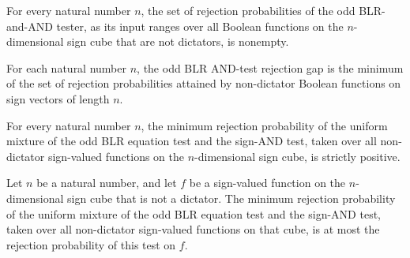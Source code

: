 \begin{theorem}
\label{FABL.oddBLRAndAndRejectionValues_nonempty}
\leanok
{}
For every natural number $n$, the set of rejection probabilities of the odd BLR-and-AND
tester, as its input ranges over all Boolean functions on the $n$-dimensional sign cube
that are not dictators, is nonempty.
\end{theorem}

\begin{definition}
\label{FABL.oddBLRAndAndRejectionGap}
\leanok
{}
For each natural number $n$, the odd BLR AND-test rejection gap is the minimum of the
set of rejection probabilities attained by non-dictator Boolean functions on sign
vectors of length $n$.
\end{definition}

\begin{theorem}
\label{FABL.oddBLRAndAndRejectionGap_pos}
\leanok
{}
For every natural number $n$, the minimum rejection probability of the uniform mixture
of the odd BLR equation test and the sign-AND test, taken over all non-dictator
sign-valued functions on the $n$-dimensional sign cube, is strictly positive.
\end{theorem}

\begin{theorem}
\label{FABL.oddBLRAndAndRejectionGap_le}
\leanok
{}
Let $n$ be a natural number, and let $f$ be a sign-valued function on the
$n$-dimensional sign cube that is not a dictator. The minimum rejection probability of
the uniform mixture of the odd BLR equation test and the sign-AND test, taken over all
non-dictator sign-valued functions on that cube, is at most the rejection probability of
this test on $f$.
\end{theorem}

